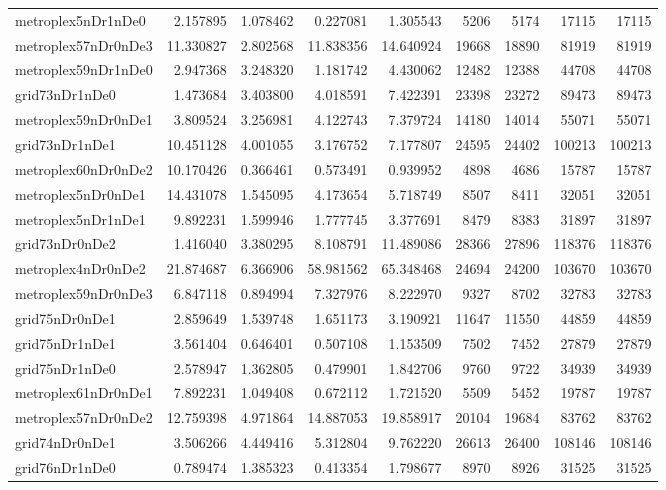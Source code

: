 \begin{longtable}{|l|r|r|r|r|r|r|r|r|}
metroplex5nDr1nDe0 & 2.157895 & 1.078462 & 0.227081 & 1.305543 & 5206 & 5174 & 17115 & 17115 \\
metroplex57nDr0nDe3 & 11.330827 & 2.802568 & 11.838356 & 14.640924 & 19668 & 18890 & 81919 & 81919 \\
metroplex59nDr1nDe0 & 2.947368 & 3.248320 & 1.181742 & 4.430062 & 12482 & 12388 & 44708 & 44708 \\
grid73nDr1nDe0 & 1.473684 & 3.403800 & 4.018591 & 7.422391 & 23398 & 23272 & 89473 & 89473 \\
metroplex59nDr0nDe1 & 3.809524 & 3.256981 & 4.122743 & 7.379724 & 14180 & 14014 & 55071 & 55071 \\
grid73nDr1nDe1 & 10.451128 & 4.001055 & 3.176752 & 7.177807 & 24595 & 24402 & 100213 & 100213 \\
metroplex60nDr0nDe2 & 10.170426 & 0.366461 & 0.573491 & 0.939952 & 4898 & 4686 & 15787 & 15787 \\
metroplex5nDr0nDe1 & 14.431078 & 1.545095 & 4.173654 & 5.718749 & 8507 & 8411 & 32051 & 32051 \\
metroplex5nDr1nDe1 & 9.892231 & 1.599946 & 1.777745 & 3.377691 & 8479 & 8383 & 31897 & 31897 \\
grid73nDr0nDe2 & 1.416040 & 3.380295 & 8.108791 & 11.489086 & 28366 & 27896 & 118376 & 118376 \\
metroplex4nDr0nDe2 & 21.874687 & 6.366906 & 58.981562 & 65.348468 & 24694 & 24200 & 103670 & 103670 \\
metroplex59nDr0nDe3 & 6.847118 & 0.894994 & 7.327976 & 8.222970 & 9327 & 8702 & 32783 & 32783 \\
grid75nDr0nDe1 & 2.859649 & 1.539748 & 1.651173 & 3.190921 & 11647 & 11550 & 44859 & 44859 \\
grid75nDr1nDe1 & 3.561404 & 0.646401 & 0.507108 & 1.153509 & 7502 & 7452 & 27879 & 27879 \\
grid75nDr1nDe0 & 2.578947 & 1.362805 & 0.479901 & 1.842706 & 9760 & 9722 & 34939 & 34939 \\
metroplex61nDr0nDe1 & 7.892231 & 1.049408 & 0.672112 & 1.721520 & 5509 & 5452 & 19787 & 19787 \\
metroplex57nDr0nDe2 & 12.759398 & 4.971864 & 14.887053 & 19.858917 & 20104 & 19684 & 83762 & 83762 \\
grid74nDr0nDe1 & 3.506266 & 4.449416 & 5.312804 & 9.762220 & 26613 & 26400 & 108146 & 108146 \\
grid76nDr1nDe0 & 0.789474 & 1.385323 & 0.413354 & 1.798677 & 8970 & 8926 & 31525 & 31525 \\

\end{longtable}
